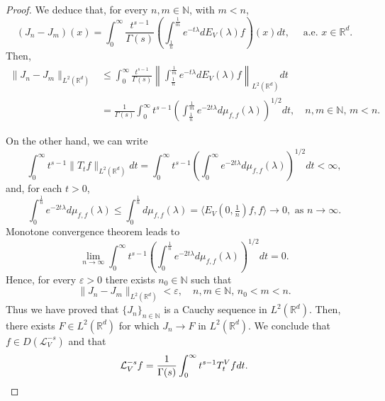 \documentclass[10pt,a4paper]{amsart}
\begin{document}
\begin{proof}
We deduce that, for every $n,m\in \mathbb N$, with $m<n$,
\[
(J_n-J_m)(x)=\int_0^\infty \frac{t^{s -1}}{\Gamma (s)}\left(\int_{\frac{1}{n}}^{\frac{1}{m}} e^{-t\lambda}dE_V(\lambda)f\right)(x)dt,\quad \text{ a.e. }x\in \mathbb R^d.
\]
Then,
\begin{align*}
\|J_n-J_m\|_{L^2(\mathbb R^d)}&\leq \int_0^\infty \frac{t^{s -1}}{\Gamma (s)}\left\|\int_{\frac{1}{n}}^{\frac{1}{m}} e^{-t\lambda}dE_V(\lambda)f\right\|_{L^2(\mathbb R^d)}dt\\
&=\frac{1}{\Gamma (s)}\int_0^\infty t^{s-1}\left(\int_{\frac{1}{n}}^{\frac{1}{m}} e^{-2t\lambda}d\mu _{f,f}(\lambda)\right)^{1/2}dt,\quad n,m\in \mathbb N,\,m<n.
\end{align*}

On the other hand, we can write
\[
\int_0^\infty t^{s -1}\|T_tf\|_{L^2(\mathbb R^d)}dt=\int_0^\infty t^{s -1}\left(\int_0^\infty e^{-2t\lambda}d\mu _{f,f}(\lambda)\right)^{1/2}dt<\infty,
\]
and, for each $t>0$,
\[
\int_0^{\frac{1}{n}}e^{-2t\lambda}d\mu _{f,f}(\lambda)\leq \int_0^{\frac{1}{n}}d\mu _{f,f}(\lambda)=\langle E_V(0,\tfrac{1}{n})f,f\rangle \longrightarrow 0,\mbox{ as }n\rightarrow \infty.
\]
Monotone convergence theorem leads to 
\[
\lim_{n\rightarrow \infty }\int_0^\infty t^{s -1}\left(\int_0^{\frac{1}{n}}e^{-2t\lambda}d\mu _{f,f}(\lambda)\right)^{1/2}dt=0.
\]
Hence, for every $\varepsilon >0$ there exists $n_0\in \mathbb N$ such that
\[
\|J_n-J_m\|_{L^2(\mathbb R^d)}<\varepsilon,\quad n,m\in \mathbb N,\,n_0<m<n.
\]
Thus we have proved that $\{J_n\}_{n\in \mathbb N}$ is a Cauchy sequence in $L^2(\mathbb R^d)$. Then, there exists $F\in L^2(\mathbb R^d)$ for which $J_n\longrightarrow F$ in $L^2(\mathbb R^d)$. We conclude that $f\in D(\mathcal L_V^{-s})$ and that
\[
\mathcal L_V^{-s}f=\frac{1}{\Gamma (s )}\int_0^\infty t^{s -1}T_t^Vfdt.\qedhere
\]
\end{proof}
\end{document}
